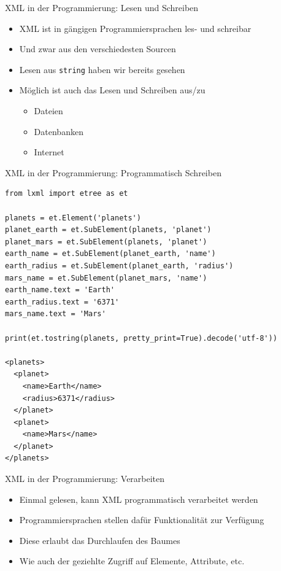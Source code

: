 \documentclass{beamer}
\begin{document}
\begin{frame}{XML in der Programmierung: Lesen und Schreiben}
	
	\begin{itemize}
		\item XML ist in gängigen Programmiersprachen les- und schreibar
		\item Und zwar aus den verschiedesten Sourcen
		\item Lesen aus \texttt{string} haben wir bereits gesehen
		\item Möglich ist auch das Lesen und Schreiben aus/zu 
		\begin{itemize}
			\item Dateien
			\item Datenbanken
			\item Internet
		\end{itemize}
	\end{itemize}
	
\end{frame}

\begin{frame}[fragile]{XML in der Programmierung: Programmatisch Schreiben}
	
	\lstset{language=Python}
	\scriptsize
	\begin{lstlisting}
from lxml import etree as et

planets = et.Element('planets')
planet_earth = et.SubElement(planets, 'planet')
planet_mars = et.SubElement(planets, 'planet')
earth_name = et.SubElement(planet_earth, 'name')
earth_radius = et.SubElement(planet_earth, 'radius')
mars_name = et.SubElement(planet_mars, 'name')
earth_name.text = 'Earth'
earth_radius.text = '6371'
mars_name.text = 'Mars'

print(et.tostring(planets, pretty_print=True).decode('utf-8'))

<planets>
  <planet>
    <name>Earth</name>
    <radius>6371</radius>
  </planet>
  <planet>
    <name>Mars</name>
  </planet>
</planets>
	\end{lstlisting}
	
\end{frame}

\begin{frame}{XML in der Programmierung: Verarbeiten}
	
	\begin{itemize}
		\item Einmal gelesen, kann XML programmatisch verarbeitet werden
		\item Programmiersprachen stellen dafür Funktionalität zur Verfügung
		\item Diese erlaubt das Durchlaufen des Baumes
		\item Wie auch der geziehlte Zugriff auf Elemente, Attribute, etc.
	\end{itemize}
	
\end{frame}
\end{document}
